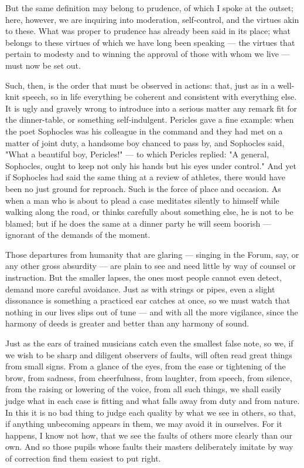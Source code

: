  But the same definition may belong to prudence, of which I spoke at the outset; here, however, we are inquiring into moderation, self-control, and the virtues akin to these. What was proper to prudence has already been said in its place; what belongs to these virtues of which we have long been speaking — the virtues that pertain to modesty and to winning the approval of those with whom we live — must now be set out.

 Such, then, is the order that must be observed in actions: that, just as in a well-knit speech, so in life everything be coherent and consistent with everything else. It is ugly and gravely wrong to introduce into a serious matter any remark fit for the dinner-table, or something self-indulgent. Pericles gave a fine example: when the poet Sophocles was his colleague in the command and they had met on a matter of joint duty, a handsome boy chanced to pass by, and Sophocles said, "What a beautiful boy, Pericles!" — to which Pericles replied: "A general, Sophocles, ought to keep not only his hands but his eyes under control." And yet if Sophocles had said the same thing at a review of athletes, there would have been no just ground for reproach. Such is the force of place and occasion. As when a man who is about to plead a case meditates silently to himself while walking along the road, or thinks carefully about something else, he is not to be blamed; but if he does the same at a dinner party he will seem boorish — ignorant of the demands of the moment.

 Those departures from humanity that are glaring — singing in the Forum, say, or any other gross absurdity — are plain to see and need little by way of counsel or instruction. But the smaller lapses, the ones most people cannot even detect, demand more careful avoidance. Just as with strings or pipes, even a slight dissonance is something a practiced ear catches at once, so we must watch that nothing in our lives slips out of tune — and with all the more vigilance, since the harmony of deeds is greater and better than any harmony of sound.

 Just as the ears of trained musicians catch even the smallest false note, so we, if we wish to be sharp and diligent observers of faults, will often read great things from small signs. From a glance of the eyes, from the ease or tightening of the brow, from sadness, from cheerfulness, from laughter, from speech, from silence, from the raising or lowering of the voice, from all such things, we shall easily judge what in each case is fitting and what falls away from duty and from nature. In this it is no bad thing to judge each quality by what we see in others, so that, if anything unbecoming appears in them, we may avoid it in ourselves. For it happens, I know not how, that we see the faults of others more clearly than our own. And so those pupils whose faults their masters deliberately imitate by way of correction find them easiest to put right.

